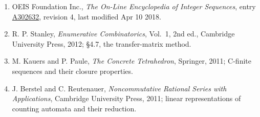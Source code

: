 \documentclass[11pt]{article}
\theoremstyle{definition}
\begin{document}
\begin{enumerate}

\item OEIS Foundation Inc., \emph{The On-Line Encyclopedia of Integer Sequences}, entry \href{https://oeis.org/A302632}{A302632}, revision 4, last modified Apr 10 2018.

\item R. P. Stanley, \emph{Enumerative Combinatorics}, Vol.~1, 2nd ed., Cambridge University Press, 2012; \S4.7, the transfer-matrix method.

\item M. Kauers and P. Paule, \emph{The Concrete Tetrahedron}, Springer, 2011; C-finite sequences and their closure properties.

\item J. Berstel and C. Reutenauer, \emph{Noncommutative Rational Series with Applications}, Cambridge University Press, 2011; linear representations of counting automata and their reduction.

\end{enumerate}
\end{document}
